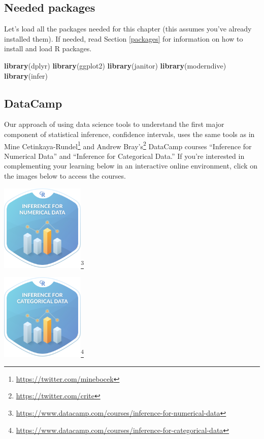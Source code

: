 \documentclass[12pt,]{krantz}
\makeatletter
\newenvironment{Shaded}{\begin{snugshade}}{\end{snugshade}}
\newcommand{\KeywordTok}[1]{\textcolor[rgb]{0.27,0.27,0.27}{\textbf{#1}}}
\newcommand{\NormalTok}[1]{#1}
\renewcommand{\href}[2]{#2\footnote{\url{#1}}}
\newenvironment{kframe}{%
\medskip{}
\setlength{\fboxsep}{.8em}
 \def\at@end@of@kframe{}%
 \ifinner\ifhmode%
  \def\at@end@of@kframe{\end{minipage}}%
  \begin{minipage}{\columnwidth}%
 \fi\fi%
 \def\FrameCommand##1{\hskip\@totalleftmargin \hskip-\fboxsep
 \colorbox{shadecolor}{##1}\hskip-\fboxsep
     \hskip-\linewidth \hskip-\@totalleftmargin \hskip\columnwidth}%
 \MakeFramed {\advance\hsize-\width
   \@totalleftmargin\z@ \linewidth\hsize
   \@setminipage}}%
 {\par\unskip\endMakeFramed%
 \at@end@of@kframe}
\renewenvironment{Shaded}{\begin{kframe}}{\end{kframe}}
\makeatother
\begin{document}
\subsection*{Needed packages}\label{needed-packages-6}


Let's load all the packages needed for this chapter (this assumes you've
already installed them). If needed, read Section \ref{packages} for
information on how to install and load R packages.

\begin{Shaded}
\begin{Highlighting}[]
\KeywordTok{library}\NormalTok{(dplyr)}
\KeywordTok{library}\NormalTok{(ggplot2)}
\KeywordTok{library}\NormalTok{(janitor)}
\KeywordTok{library}\NormalTok{(moderndive)}
\KeywordTok{library}\NormalTok{(infer)}
\end{Highlighting}
\end{Shaded}

\subsection*{DataCamp}\label{datacamp-5}


Our approach of using data science tools to understand the first major
component of statistical inference, confidence intervals, uses the same
tools as in \href{https://twitter.com/minebocek}{Mine Cetinkaya-Rundel}
and \href{https://twitter.com/crite}{Andrew Bray's} DataCamp courses
``Inference for Numerical Data'' and ``Inference for Categorical Data.''
If you're interested in complementing your learning below in an
interactive online environment, click on the images below to access the
courses.

\begin{center}
\href{https://www.datacamp.com/courses/inference-for-numerical-data}{\includegraphics[width=0.3\textwidth]{images/datacamp_inference_for_numerical_data.png}}
\end{center}\begin{center}
\href{https://www.datacamp.com/courses/inference-for-categorical-data}{\includegraphics[width=0.3\textwidth]{images/datacamp_inference_for_categorical_data.png}}
\end{center}
\end{document}
